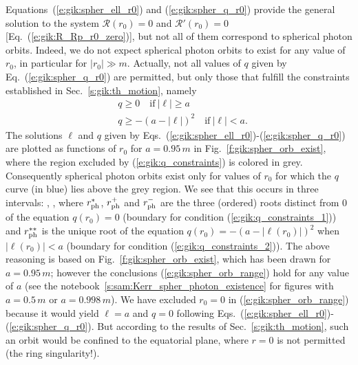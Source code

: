 Equations~(\ref{e:gik:spher_ell_r0}) and (\ref{e:gik:spher_q_r0}) provide
the general solution to the system $\mathcal{R}(r_0) = 0$ and $\mathcal{R}'(r_0) = 0$
[Eq.~(\ref{e:gik:R_Rp_r0_zero})], but not all
of them correspond to spherical photon orbits. Indeed, we do not expect
spherical photon orbits to exist for any value of $r_0$, in particular
for $|r_0|\gg m$. Actually, not all values of $q$ given by Eq.~(\ref{e:gik:spher_q_r0})
are permitted, but only those that fulfill the constraints established in
Sec.~\ref{s:gik:th_motion}, namely
\begin{subequations}
\label{e:gik:q_constraints}
\begin{align}
    & q \geq 0 \quad \mbox{if}\  |\ell| \geq a \label{e:gik:q_constraints_1}\\
    & q \geq - \left( a - |\ell| \right) ^2  \quad \mbox{if}\  |\ell| < a . \label{e:gik:q_constraints_2}
\end{align}
\end{subequations}
The solutions $\ell$ and $q$ given by Eqs.~(\ref{e:gik:spher_ell_r0})-(\ref{e:gik:spher_q_r0})
are plotted as functions of $r_0$ for $a=0.95\, m$
in Fig.~\ref{f:gik:spher_orb_exist}, where the
region excluded by (\ref{e:gik:q_constraints}) is colored in grey. Consequently
spherical photon orbits exist only for values of $r_0$ for which the $q$ curve
(in blue) lies above the grey region. We see that this occurs in three intervals:
\be \label{e:gik:spher_orb_range}
    \encadre{ r_0 \in [r_{\rm ph}^{**}, 0) },\quad
    \encadre{ r_0 \in (0, r_{\rm ph}^*] }
    \qand
    ,
\ee
where $r_{\rm ph}^*$, $r_{\rm ph}^+$ and $r_{\rm ph}^-$ are the three (ordered) roots
distinct from $0$ of the equation $q(r_0) = 0$ (boundary for
condition (\ref{e:gik:q_constraints_1})) and $r_{\rm ph}^{**}$ is the unique
root of the equation $q(r_0) = - \left( a - |\ell(r_0)| \right) ^2$ when
$|\ell(r_0)|  < a$ (boundary for condition (\ref{e:gik:q_constraints_2})).
The above reasoning is based on Fig.~\ref{f:gik:spher_orb_exist}, which has
been drawn for $a=0.95\, m$; however the conclusions (\ref{e:gik:spher_orb_range})
hold for any value of $a$ (see the notebook~\ref{s:sam:Kerr_spher_photon_existence}
for figures with $a=0.5\, m$ or $a=0.998\, m$). We have excluded $r_0=0$
in (\ref{e:gik:spher_orb_range}) because it would yield $\ell = a$ and $q=0$
following Eqs.~(\ref{e:gik:spher_ell_r0})-(\ref{e:gik:spher_q_r0}). But
according to the results of Sec.~\ref{s:gik:th_motion}, such an orbit
would be confined to the equatorial plane, where $r=0$ is not permitted (the ring singularity!).

